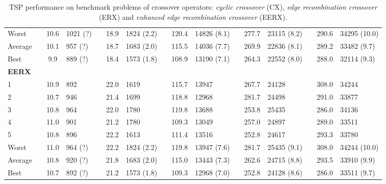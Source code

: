 \begin{sidewaystable}[hbpt]
{\begin{tabular} {l l S  l l S l l S l l S l l S l}
Worst  &&  10.6 & 1021 (?) && 18.9 & 1824 (2.2) && 120.4  & 14826 (8.1) &&  277.7  & 23115 (8.2) &&  290.6  & 34295 (10.0)  \\
Average&&  10.1 & 957 (?) && 18.7 & 1683 (2.0) &&  115.5  &  14036 (7.7) &&  269.9  & 22836 (8.1) && 289.2  & 33482 (9.7)    \\
Best   && 9.9 & 889 (?) && 18.4 & 1573 (1.8)  &&  108.9  &  13190 (7.1)&&  264.3 & 22552 (8.0) && 288.0  &  32114 (9.3)     
\\\midrule\addlinespace\addlinespace
\textbf{EERX}\\
1   &&  10.9 & 892 && 22.0 & 1619  &&  115.7 & 13947  && 267.7 & 24128 && 308.0 & 34244 \\
2   &&  10.7 & 946 && 21.4 & 1699  && 118.8 & 12968 && 281.7 & 24498 &&  291.0 & 33877   \\
3   &&  10.8 & 964 && 22.0 & 1780 &&  119.8 & 13688 &&  253.8    & 25435  && 286.0  & 34136     \\
4   &&  11.0 & 901 && 21.2 & 1780  && 109.3     & 13049   && 257.0 & 24897  && 289.0 & 33511  \\
5   &&  10.8 & 896 && 22.2 & 1613  && 111.4     & 13516       && 252.8  & 24617 && 293.3    & 33780   \\ \addlinespace
Worst  &&  11.0 & 964 (?) && 22.2 & 1824 (2.2) &&  119.8  & 13947  (7.6) && 281.7   & 25435 (9.1) &&  308.0 &  34244 (10.0)  \\
Average&&  10.8 & 920 (?) && 21.8 & 1683 (2.0) && 115.0  & 13443  (7.3) && 262.6   &  24715 (8.8) && 293.5   & 33910  (9.9)    \\
Best   && 10.7 & 892 (?) && 21.2 & 1573 (1.8)  &&  109.3 & 12968  (7.0)&&  252.8 &  24128 (8.6) &&  286.0 &  33511 (9.7)     \\
\bottomrule
\end{tabular}}
\caption[TSP performance on benchmark problems of crossover operators (2).]{TSP performance on benchmark problems of crossover operators: \emph{cyclic crossover} (CX), \emph{edge recombination crossover} (ERX) and \emph{enhanced edge recombination crossover} (EERX).}
\label{tab:crossover2}
\end{sidewaystable}
